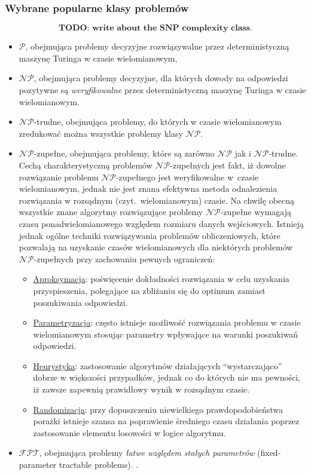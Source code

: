 \subsubsection{\textbf{Wybrane popularne klasy problemów}}
\label{sss_popular_cplx_classes}
\[
\textbf{TODO: write about the SNP complexity class.}
\]
\par{
\begin{itemize}
  \item $\mathcal{P}$, obejmująca problemy decyzyjne rozwiązywalne przez
    deterministyczną maszynę Turinga w czasie wielomianowym,
  \item $\mathcal{NP}$, obejmująca problemy decyzyjne, dla których dowody na 
    odpowiedzi pozytywne są \emph{weryfikowalne} przez deterministyczną maszynę
    Turinga w czasie wielomianowym.
  \item $\mathcal{NP}$-trudne, obejmująca problemy, do których w czasie
    wielomianowym zredukować można wszystkie problemy klasy $\mathcal{NP}$.
  \item $\mathcal{NP}$-zupełne, obejmująca problemy, które są zarówno
    $\mathcal{NP}$ jak i $\mathcal{NP}$-trudne.
    Cechą charakterystyczną problemów $\mathcal{NP}$-zupełnych jest fakt, iż
    dowolne rozwiązanie problemu $\mathcal{NP}$-zupełnego jest weryfikowalne
    w~czasie wielomianowym, jednak nie jest znana efektywna metoda odnalezienia
    rozwiązania w rozsądnym (czyt.\ wielomianowym) czasie. 
    Na chwilę obecną wszystkie znane algorytmy rozwiązujące problemy 
    $\mathcal{NP}$-zupełne wymagają czasu ponadwielomianowego względem rozmiaru
    danych wejściowych.
    Istnieją jednak ogólne techniki rozwiązywania problemów obliczeniowych,
    które pozwalają na uzyskanie czasów wielomianowych dla niektórych problemów
    $\mathcal{NP}$-zupełnych przy zachowaniu pewnych ograniczeń:
    \begin{itemize}
      \item \underline{Aproksymacja}: poświęcenie dokładności rozwiązania
        w celu uzyskania przyspieszenia, polegające na zbliżaniu się do
        optimum zamiast poszukiwania odpowiedzi.
      \item \underline{Parametryzacja}: często istnieje możliwość rozwiązania
        problemu w czasie wielomianowym stosując parametry wpływające na warunki
        poszukiwań odpowiedzi.
      \item \underline{Heurystyka}: zastosowanie algorytmów działających
        ``wystarczająco'' dobrze w większości przypadków, jednak co do których
        nie ma pewności, iż zawsze zapewnią prawidłowy wynik w rozsądnym czasie.
      \item \underline{Randomizacja}: przy dopuszczeniu niewielkiego
        prawdopodobieństwa porażki istnieje szansa na poprawienie
        średniego czasu działania poprzez zastosowanie elementu losowości w
        logice algorytmu.
    \end{itemize}
  \item $\mathcal{FPT}$, obejmująca problemy \emph{łatwe względem
    stałych parametrów} (fixed-parameter tractable problems). .
\end{itemize}

}
